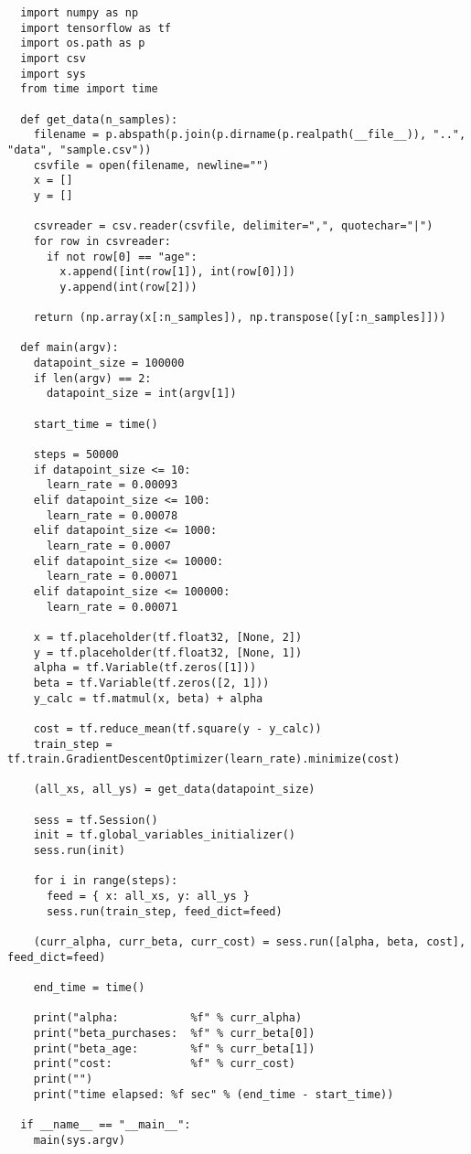 \begin{verbatim}
  import numpy as np
  import tensorflow as tf
  import os.path as p
  import csv
  import sys
  from time import time

  def get_data(n_samples):
    filename = p.abspath(p.join(p.dirname(p.realpath(__file__)), "..", "data", "sample.csv"))
    csvfile = open(filename, newline="")
    x = []
    y = []

    csvreader = csv.reader(csvfile, delimiter=",", quotechar="|")
    for row in csvreader:
      if not row[0] == "age":
        x.append([int(row[1]), int(row[0])])
        y.append(int(row[2]))

    return (np.array(x[:n_samples]), np.transpose([y[:n_samples]]))

  def main(argv):
    datapoint_size = 100000
    if len(argv) == 2:
      datapoint_size = int(argv[1])

    start_time = time()

    steps = 50000
    if datapoint_size <= 10:
      learn_rate = 0.00093
    elif datapoint_size <= 100:
      learn_rate = 0.00078
    elif datapoint_size <= 1000:
      learn_rate = 0.0007
    elif datapoint_size <= 10000:
      learn_rate = 0.00071
    elif datapoint_size <= 100000:
      learn_rate = 0.00071

    x = tf.placeholder(tf.float32, [None, 2])
    y = tf.placeholder(tf.float32, [None, 1])
    alpha = tf.Variable(tf.zeros([1]))
    beta = tf.Variable(tf.zeros([2, 1]))
    y_calc = tf.matmul(x, beta) + alpha

    cost = tf.reduce_mean(tf.square(y - y_calc))
    train_step = tf.train.GradientDescentOptimizer(learn_rate).minimize(cost)

    (all_xs, all_ys) = get_data(datapoint_size)

    sess = tf.Session()
    init = tf.global_variables_initializer()
    sess.run(init)

    for i in range(steps):
      feed = { x: all_xs, y: all_ys }
      sess.run(train_step, feed_dict=feed)

    (curr_alpha, curr_beta, curr_cost) = sess.run([alpha, beta, cost], feed_dict=feed)

    end_time = time()

    print("alpha:           %f" % curr_alpha)
    print("beta_purchases:  %f" % curr_beta[0])
    print("beta_age:        %f" % curr_beta[1])
    print("cost:            %f" % curr_cost)
    print("")
    print("time elapsed: %f sec" % (end_time - start_time))

  if __name__ == "__main__":
    main(sys.argv)
\end{verbatim}

